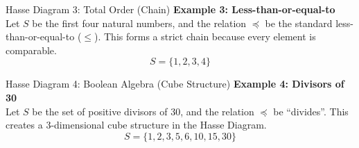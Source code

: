 \documentclass{beamer}
\begin{document}
\begin{frame}{Hasse Diagram 3: Total Order (Chain)}
    \textbf{Example 3: Less-than-or-equal-to} \\
    \hspace*{1.5em}Let $S$ be the first four natural numbers, and the relation $\preceq$ be the standard less-than-or-equal-to ($\le$). This forms a strict chain because every element is comparable.
    \[ S = \{1, 2, 3, 4\} \]
    
    \begin{center}
    \end{center}
\end{frame}

\begin{frame}{Hasse Diagram 4: Boolean Algebra (Cube Structure)}
    \textbf{Example 4: Divisors of 30} \\
    \hspace*{1.5em}Let $S$ be the set of positive divisors of 30, and the relation $\preceq$ be ``divides''. This creates a 3-dimensional cube structure in the Hasse Diagram.
    \[ S = \{1, 2, 3, 5, 6, 10, 15, 30\} \]
    
    \begin{center}
    \end{center}
\end{frame}
\end{document}
